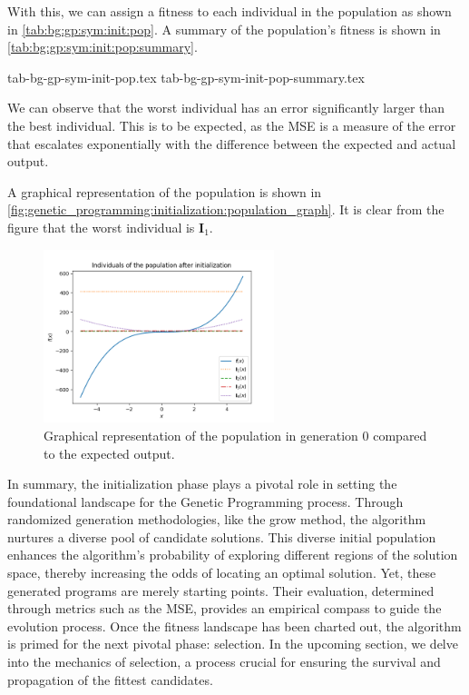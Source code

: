   With this, we can assign a fitness to each individual in the population as
  shown in \vref{tab:bg:gp:sym:init:pop}.
  A summary of the population's fitness is shown in
  \vref{tab:bg:gp:sym:init:pop:summary}.

  {tab-bg-gp-sym-init-pop.tex}
  {tab-bg-gp-sym-init-pop-summary.tex}

  We can observe that the worst individual has an error significantly larger
  than the best individual.
  This is to be expected, as the MSE is a measure of the error that escalates
  exponentially with the difference between the expected and actual output.  

  A graphical representation of the population is shown in
  \vref{fig:genetic_programming:initialization:population_graph}.
  It is clear from the figure that the worst individual is \(\mathbf{I}_1\).

  \begin{figure}[ht!]
    \centering
    \includegraphics[width=0.6\textwidth]
      {img/theoretical_framework/gp_pop_init.png}
    \caption{
      Graphical representation of the population in generation 0 compared to the
      expected output.
    }
    \label{fig:genetic_programming:initialization:population_graph}
  \end{figure}

  In summary, the initialization phase plays a pivotal role in setting the 
  foundational landscape for the Genetic Programming process. Through randomized 
  generation methodologies, like the grow method, the algorithm nurtures a 
  diverse pool of candidate solutions. This diverse initial population enhances 
  the algorithm's probability of exploring different regions of the solution 
  space, thereby increasing the odds of locating an optimal solution. Yet, these 
  generated programs are merely starting points. Their evaluation, determined 
  through metrics such as the MSE, provides an empirical compass to guide the 
  evolution process. Once the fitness landscape has been charted out, the 
  algorithm is primed for the next pivotal phase: selection. In the upcoming 
  section, we delve into the mechanics of selection, a process crucial for 
  ensuring the survival and propagation of the fittest candidates.
